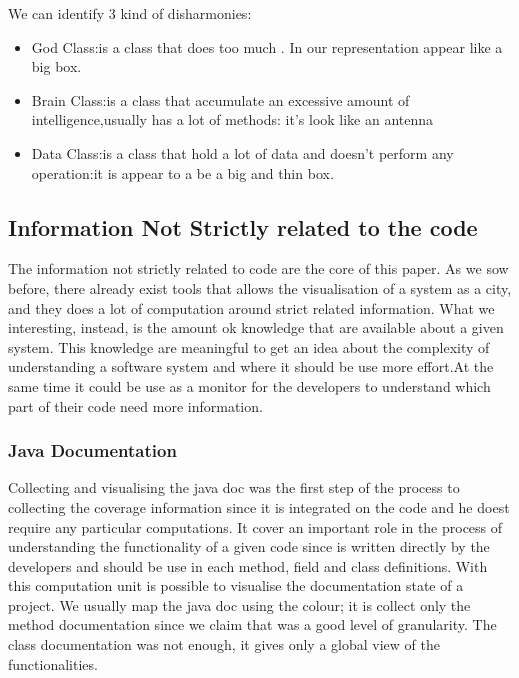 \documentclass[]{usiinfbachelorproject}
\begin{document}
We can identify 3 kind of disharmonies:
\begin{itemize}

\item{God Class}:is a class that does too much . In our representation appear like a big box.
\item{Brain Class}:is a class that accumulate an excessive amount of intelligence,usually has a lot of methods: it's look like an antenna
\item{Data Class}:is a class that hold a lot of data and doesn't perform any operation:it is appear to a be a big and thin box.

\end{itemize} 


    
\newpage
\subsection{Information Not Strictly related to the code}
The information not strictly related to  code are the core of this paper. As we sow before, there already exist tools that allows the visualisation of a system as a city, and they does a lot of computation around strict related information. What we interesting, instead, is the amount ok knowledge that are available about a given system. This knowledge are meaningful to get an idea about the complexity of understanding a software system and where it should be use more effort.At the same time it  could  be use as a monitor for the developers to understand which part of their code need more information.  


\subsubsection{Java Documentation}
Collecting and visualising the java doc was the first step of the process to collecting the coverage information since it is integrated on the code and he doest require any  particular computations. It cover an important role in the process of understanding the functionality of a given code since is written directly by the developers and should be use in each method, field and class definitions.
With this computation unit is possible to visualise the documentation state of a project. We usually map the java doc using the colour; it is collect only the method documentation since we claim that was a good level of granularity. The class documentation was not enough, it gives only a global view of the functionalities.
\end{document}

